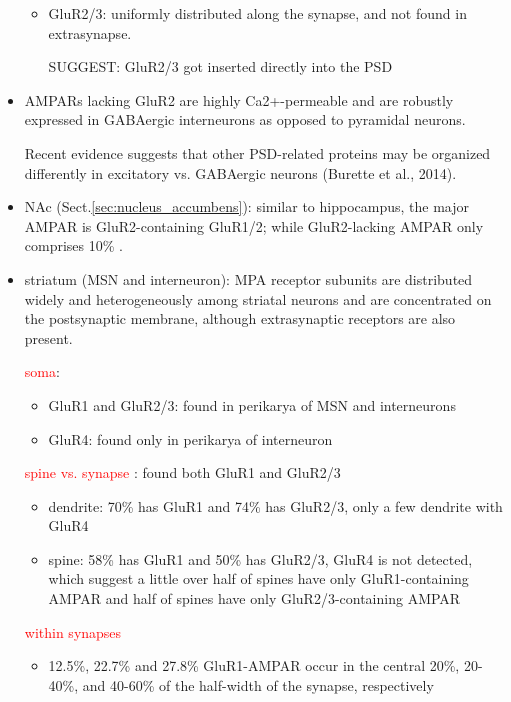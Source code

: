 \begin{itemize}
\begin{itemize}
    \item GluR2/3: uniformly distributed along the synapse, and not found in
    extrasynapse.

SUGGEST: GluR2/3 got inserted directly into the PSD    

  \end{itemize}

  \item AMPARs lacking GluR2 are highly Ca2+-permeable and are robustly
  expressed in GABAergic interneurons as opposed to pyramidal neurons.
  
  Recent evidence suggests that other PSD-related proteins may be organized
  differently in excitatory vs. GABAergic neurons (Burette et al., 2014).
  
  \item NAc (Sect.\ref{sec:nucleus_accumbens}): similar to hippocampus, the
  major AMPAR is GluR2-containing GluR1/2; while GluR2-lacking AMPAR only
  comprises 10\% \citep{ferrario2011}.
  
  \item striatum (MSN and interneuron): MPA receptor subunits are distributed
  widely and heterogeneously among striatal neurons and are concentrated on the
  postsynaptic membrane, although extrasynaptic receptors are also present.
  
  \textcolor{red}{soma}: \citep{bernard1997}
  \begin{itemize}
    \item GluR1 and GluR2/3: found in perikarya of MSN and interneurons
    
    \item GluR4: found only in perikarya of interneuron
  \end{itemize}
  
  \textcolor{red}{spine vs. synapse} \citep{bernard1997}: found 
  both GluR1 and GluR2/3
  \begin{itemize}
    \item dendrite: 70\% has GluR1 and 74\% has GluR2/3, only a few dendrite
    with GluR4
    
    \item spine: 58\% has GluR1 and 50\% has GluR2/3, GluR4 is not detected,
    which suggest a little over half of spines have only GluR1-containing AMPAR
    and half of spines have only GluR2/3-containing AMPAR
    
  \end{itemize}
  
  \textcolor{red}{within synapses}
  \begin{itemize}
    \item 12.5\%, 22.7\% and 27.8\%  GluR1-AMPAR occur in the central 20\%,
    20-40\%, and 40-60\% of the half-width of the synapse, respectively
    

\end{itemize}
\end{itemize}
